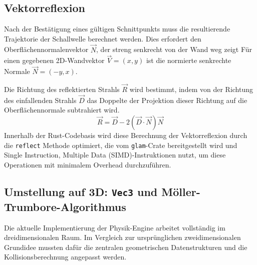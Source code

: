 \documentclass{article}
\begin{document}
    \subsection{Vektorreflexion}\label{subsec:reflection-vector-calculation}


    Nach der Bestätigung eines gültigen Schnittpunkts muss die resultierende Trajektorie der Schallwelle berechnet werden.
    Dies erfordert den Oberflächennormalenvektor $\vec{N}$, der streng senkrecht von der Wand weg zeigt
    Für einen gegebenen 2D-Wandvektor $\vec{V} = (x, y)$ ist die normierte senkrechte Normale $\vec{N} = (-y, x)$.


    Die Richtung des reflektierten Strahls $\vec{R}$ wird bestimmt, indem von der Richtung des einfallenden Strahls $\vec{D}$ das Doppelte der Projektion dieser Richtung
    auf die Oberflächennormale subtrahiert wird.
    \[\vec{R} = \vec{D} - 2(\vec{D} \cdot \vec{N})\vec{N}\]
    Innerhalb der Rust-Codebasis wird diese Berechnung der Vektorreflexion durch die \texttt{reflect} Methode optimiert, die vom \texttt{glam}-Crate bereitgestellt wird und
    Single Instruction, Multiple Data (SIMD)-Instruktionen nutzt, um diese Operationen mit minimalem Overhead durchzuführen.

    \subsection{Umstellung auf 3D: \texttt{Vec3} und Möller-Trumbore-Algorithmus}
    \label{subsec:3d-migration}

    Die aktuelle Implementierung der Physik-Engine arbeitet vollständig im
    dreidimensionalen Raum. Im Vergleich zur ursprünglichen zweidimensionalen
    Grundidee mussten dafür die zentralen geometrischen Datenstrukturen und die
    Kollisionsberechnung angepasst werden.
\end{document}
